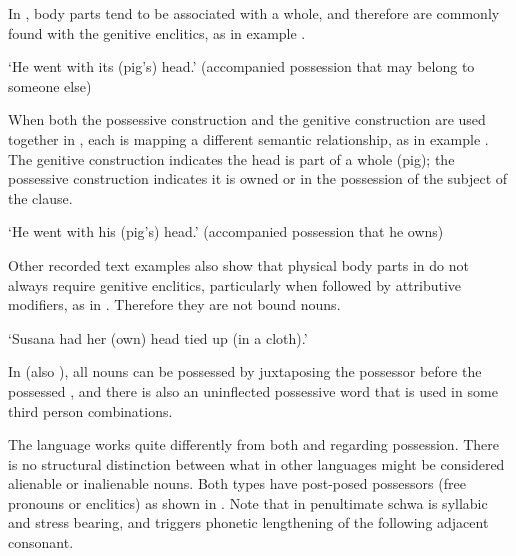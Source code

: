 In , body parts tend to be associated with a whole,
and therefore are commonly found with the genitive enclitics,
as in example .

\begin{exe}
			\glt	‘He went with its (pig’s) head.’
						(accompanied possession that may belong to someone else)
						\label{ex:02-12}
\end{exe}

When both the possessive construction
and the genitive construction are used together in ,
each is mapping a different semantic relationship,
as in example .
The genitive construction indicates the head is part of a whole
(pig); the possessive construction indicates it is owned or in
the possession of the subject of the clause.

\begin{exe}
			\glt	‘He went with his (pig’s) head.’
						(accompanied possession that he owns)
						\label{ex:02-13}
\end{exe}

Other recorded text examples also show that physical body parts
in  do not always require genitive enclitics,
particularly when followed by attributive modifiers, as in .
Therefore they are not bound nouns.

\begin{exe}
			\glt	‘Susana had her (own) head tied up (in a cloth).’
						\label{ex:02-14}
\end{exe}

In  (also ),
all nouns can be possessed by juxtaposing the possessor before
the possessed \citep[280--293]{Bloyd2020},
and there is also an uninflected possessive word that is used
in some third person combinations.

The  language  \citep{Grimes2010a} works
quite differently from both 
and  regarding possession.
There is no structural distinction between what in other languages
might be considered alienable or inalienable nouns.
Both types have post-posed possessors (free pronouns or enclitics)
as shown in .
Note that in  penultimate schwa is syllabic
and stress bearing, and triggers phonetic lengthening of the following adjacent consonant.

